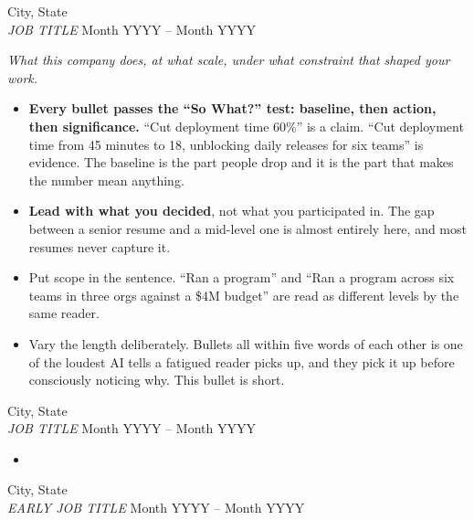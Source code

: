 \documentclass[10pt,letterpaper]{article}
\newcommand{\dateline}[1]{{\ttfamily\footnotesize\color{faint}#1}}
\newcommand{\resumesubheading}[4]{%
    \noindent{\bfseries\color{base900}#1} \hfill \dateline{#2} \\
    {\itshape\color{muted}#3} \hfill \dateline{#4}}
\begin{document}
\resumesubheading{COMPANY}{City, State}{JOB TITLE}{Month YYYY -- Month YYYY}

\vspace{2pt}

\noindent\textit{\small What this company does, at what scale, under what
constraint that shaped your work.}

\vspace{2pt}

\begin{itemize}[nosep, topsep=2pt, itemsep=3pt]
    \item \textbf{Every bullet passes the ``So What?'' test: baseline, then
          action, then significance.} ``Cut deployment time 60\%'' is a claim.
          ``Cut deployment time from 45 minutes to 18, unblocking daily releases
          for six teams'' is evidence. The baseline is the part people drop and
          it is the part that makes the number mean anything.
    \item \textbf{Lead with what you decided}, not what you participated in.
          The gap between a senior resume and a mid-level one is almost entirely
          here, and most resumes never capture it.
    \item Put scope in the sentence. ``Ran a program'' and ``Ran a program across
          six teams in three orgs against a \$4M budget'' are read as different
          levels by the same reader.
    \item Vary the length deliberately. Bullets all within five words of each
          other is one of the loudest AI tells a fatigued reader picks up, and
          they pick it up before consciously noticing why. This bullet is short.
\end{itemize}

\vspace{2pt}

\resumesubheading{COMPANY}{City, State}{JOB TITLE}{Month YYYY -- Month YYYY}

\begin{itemize}[nosep, topsep=2pt, itemsep=3pt]
    \item
\end{itemize}

\vspace{2pt}
\resumesubheading{COMPANY}{City, State}{EARLY JOB TITLE}{Month YYYY -- Month YYYY}\\[3pt]
\end{document}
